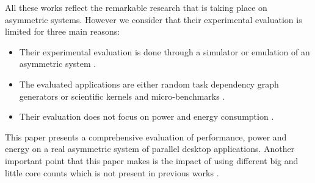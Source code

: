 

All these works reflect the remarkable research that is taking place on asymmetric systems. 
However we consider that their experimental evaluation is limited for three main reasons:
\begin{itemize}
  \item Their experimental evaluation is done through a simulator or emulation of an asymmetric system \cite{Kumar_micro_2003, Kumar:ISCA2004, Morad_area_based, Balakrishnan:ISCA2005, Koufaty_bias, VanCraeynest_fairness, VanCraeynest_PIE, Rodrigues_thread_scheduling, Hetero93, Hetero95, Dup09, Suleman:APLOS2009, Joao:ASPLOS2012,Joao:ISCA2013}.
  \item The evaluated applications are either random task dependency graph generators or scientific kernels and micro-benchmarks \cite{Hetero93, Chronaki:ICS2015, HEFT, LDCP}.
  \item Their evaluation does not focus on power and energy consumption \cite{Kumar:ISCA2004, VanCraeynest_fairness, VanCraeynest_PIE, Hetero93, Hetero95, Chronaki:ICS2015}.
\end{itemize}
This paper presents a comprehensive evaluation of performance, power and energy on a real asymmetric system of parallel desktop applications.
Another important point that this paper makes is the impact of using different big and little core counts which is not present in previous works \cite{Cong_quickIA}.










































